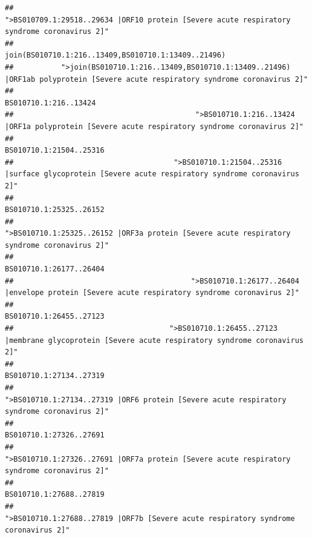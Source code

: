 \documentclass[
]{article}
\begin{document}
\begin{verbatim}
##                                            ">BS010709.1:29518..29634 |ORF10 protein [Severe acute respiratory syndrome coronavirus 2]" 
##                                                                                    join(BS010710.1:216..13409,BS010710.1:13409..21496) 
##           ">join(BS010710.1:216..13409,BS010710.1:13409..21496) |ORF1ab polyprotein [Severe acute respiratory syndrome coronavirus 2]" 
##                                                                                                                  BS010710.1:216..13424 
##                                          ">BS010710.1:216..13424 |ORF1a polyprotein [Severe acute respiratory syndrome coronavirus 2]" 
##                                                                                                                BS010710.1:21504..25316 
##                                     ">BS010710.1:21504..25316 |surface glycoprotein [Severe acute respiratory syndrome coronavirus 2]" 
##                                                                                                                BS010710.1:25325..26152 
##                                            ">BS010710.1:25325..26152 |ORF3a protein [Severe acute respiratory syndrome coronavirus 2]" 
##                                                                                                                BS010710.1:26177..26404 
##                                         ">BS010710.1:26177..26404 |envelope protein [Severe acute respiratory syndrome coronavirus 2]" 
##                                                                                                                BS010710.1:26455..27123 
##                                    ">BS010710.1:26455..27123 |membrane glycoprotein [Severe acute respiratory syndrome coronavirus 2]" 
##                                                                                                                BS010710.1:27134..27319 
##                                             ">BS010710.1:27134..27319 |ORF6 protein [Severe acute respiratory syndrome coronavirus 2]" 
##                                                                                                                BS010710.1:27326..27691 
##                                            ">BS010710.1:27326..27691 |ORF7a protein [Severe acute respiratory syndrome coronavirus 2]" 
##                                                                                                                BS010710.1:27688..27819 
##                                                    ">BS010710.1:27688..27819 |ORF7b [Severe acute respiratory syndrome coronavirus 2]" 

\end{verbatim}
\end{document}
